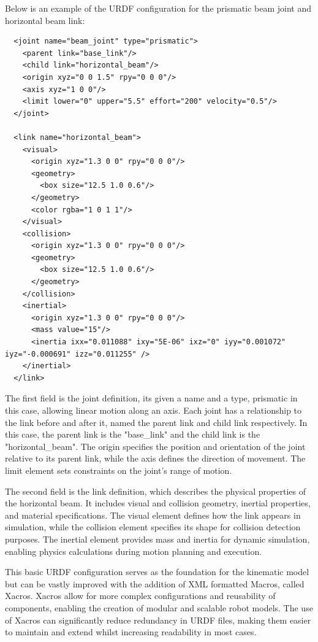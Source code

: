 \documentclass[10pt,a4paper,english]{article}
\begin{document}
Below is an example of the URDF configuration for the prismatic beam joint and horizontal beam link:
\begin{verbatim}
  <joint name="beam_joint" type="prismatic">
    <parent link="base_link"/>
    <child link="horizontal_beam"/>
    <origin xyz="0 0 1.5" rpy="0 0 0"/>
    <axis xyz="1 0 0"/>
    <limit lower="0" upper="5.5" effort="200" velocity="0.5"/>
  </joint>

  <link name="horizontal_beam">
    <visual>
      <origin xyz="1.3 0 0" rpy="0 0 0"/>
      <geometry>
        <box size="12.5 1.0 0.6"/>
      </geometry>
      <color rgba="1 0 1 1"/>
    </visual>
    <collision>
      <origin xyz="1.3 0 0" rpy="0 0 0"/>
      <geometry>
        <box size="12.5 1.0 0.6"/>
      </geometry>
    </collision>
    <inertial>
      <origin xyz="1.3 0 0" rpy="0 0 0"/>
      <mass value="15"/>
      <inertia ixx="0.011088" ixy="5E-06" ixz="0" iyy="0.001072" iyz="-0.000691" izz="0.011255" />
    </inertial>
  </link>
\end{verbatim}
The first field is the joint definition, its given a name and a type, prismatic in this case, allowing linear motion along an axis. Each joint has a relationship to the link before and after it, named the parent link and child link respectively. In this case, the parent link is the "base\_link" and the child link is the "horizontal\_beam". The origin specifies the position and orientation of the joint relative to its parent link, while the axis defines the direction of movement. The limit element sets constraints on the joint's range of motion.

The second field is the link definition, which describes the physical properties of the horizontal beam. It includes visual and collision geometry, inertial properties, and material specifications. The visual element defines how the link appears in simulation, while the collision element specifies its shape for collision detection purposes. The inertial element provides mass and inertia for dynamic simulation, enabling physics calculations during motion planning and execution.

This basic URDF configuration serves as the foundation for the kinematic model but can be vastly improved with the addition of XML formatted Macros, called Xacros. Xacros allow for more complex configurations and reusability of components, enabling the creation of modular and scalable robot models. The use of Xacros can significantly reduce redundancy in URDF files, making them easier to maintain and extend whilst increasing readability in most cases.
\end{document}
